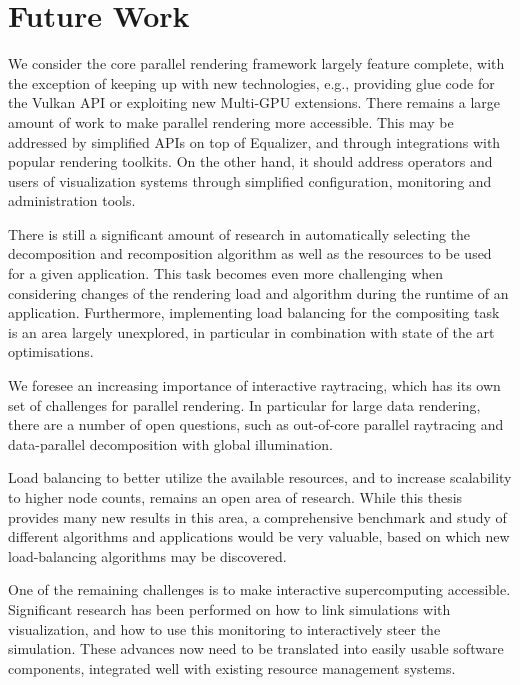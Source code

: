 \section{Future Work}

We consider the core parallel rendering framework largely feature complete,
with the exception of keeping up with new technologies, e.g., providing glue
code for the Vulkan API or exploiting new Multi-GPU extensions. There remains a
large amount of work to make parallel rendering more accessible. This may be
addressed by simplified APIs on top of Equalizer, and through integrations with
popular rendering toolkits. On the other hand, it should address operators and
users of visualization systems through simplified configuration, monitoring and
administration tools.

There is still a significant amount of research in automatically selecting the
decomposition and recomposition algorithm as well as the resources to be used
for a given application. This task becomes even more challenging when
considering changes of the rendering load and algorithm during the runtime of
an application. Furthermore, implementing load balancing for the compositing
task is an area largely unexplored, in particular in combination with state
of the art optimisations.

We foresee an increasing importance of interactive raytracing, which has its
own set of challenges for parallel rendering. In particular for large data
rendering, there are a number of open questions, such as out-of-core parallel
raytracing and data-parallel decomposition with global illumination.

Load balancing to better utilize the available resources, and to increase
scalability to higher node counts, remains an open area of research. While this
thesis provides many new results in this area, a comprehensive benchmark and
study of different algorithms and applications would be very valuable, based on
which new load-balancing algorithms may be discovered.

One of the remaining challenges is to make interactive supercomputing
accessible. Significant research has been performed on how to link simulations
with visualization, and how to use this monitoring to interactively steer the
simulation. These advances now need to be translated into easily usable
software components, integrated well with existing resource management systems.
